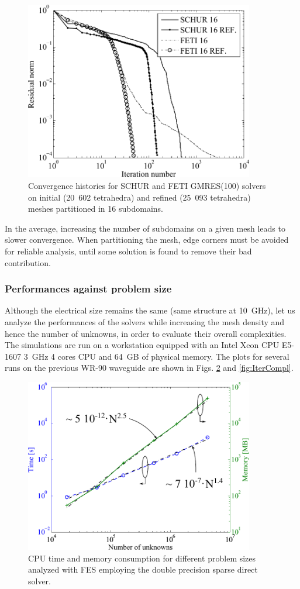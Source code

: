 \begin{figure}[h!]
\centering
\includegraphics[width=10cm]{DD16ref}
\caption{Convergence histories for SCHUR and FETI GMRES(100) solvers on initial (20~602 tetrahedra) and refined (25~093 tetrahedra) meshes partitioned in 16 subdomains.}
\label{fig:DD16ref}
\end{figure}

In the average, increasing the number of subdomains on a given mesh leads to slower convergence. When partitioning the mesh, edge corners must be avoided for reliable analysis, until some solution is found to remove their bad contribution.

\subsubsection{Performances against problem size}

Although the electrical size remains the same (same structure at 10~GHz), let us analyze the performances of the solvers while increasing the mesh density and hence the number of unknowns, in order to evaluate their overall complexities. The simulations are run on a workstation equipped with an Intel Xeon CPU E5-1607 3~GHz 4 cores CPU and 64~GB of physical memory. The plots for several runs on the previous WR-90 waveguide are shown in Figs. \ref{fig:DirectCompl} and \ref{fig:IterCompl}.

\begin{figure}[h!]
\centering
\includegraphics[width=10cm]{DirectCompl}
\caption{CPU time and memory consumption for different problem sizes analyzed with FES employing the double precision sparse direct solver.}
\label{fig:DirectCompl}
\end{figure}

